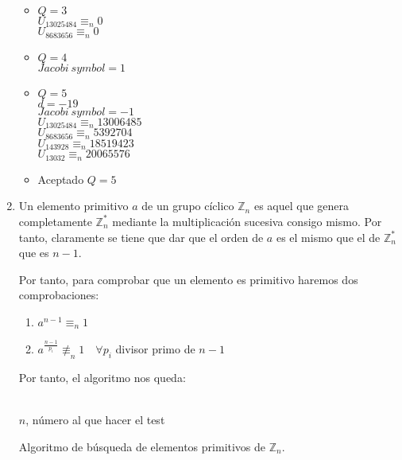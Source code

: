 \begin{enumerate}
\begin{itemize}
			\item $Q = 3$ \\
			$U_{13025484} \equiv_n 0$ \\
			$U_{8683656} \equiv_n 0$
			
			\item $Q = 4$ \\
			$Jacobi\ symbol = 1$
			
			\item $Q = 5$ \\
			$d = -19$ \\
			$Jacobi\ symbol = -1$ \\
			$U_{13025484} \equiv_n 13006485$ \\
			$U_{8683656} \equiv_n 5392704$ \\
			$U_{143928} \equiv_n 18519423$ \\
			$U_{13032} \equiv_n 20065576$
			
			\item Aceptado $Q = 5$
		\end{itemize}

		\item Un elemento primitivo $a$ de un grupo cíclico $\mathbb{Z}_n$ es aquel que genera completamente
		$\mathbb{Z}_n^*$ mediante la multiplicación sucesiva consigo mismo. Por tanto, claramente se tiene que
		dar que el orden de $a$ es el mismo que el de $\mathbb{Z}_n^*$ que es $n-1$.
		
		Por tanto, para comprobar que un elemento es primitivo haremos dos comprobaciones:
		\begin{enumerate}
			\item $a^{n-1} \equiv_n 1$
			\item $a^\frac{n-1}{p_i} \not\equiv_n 1 \quad \forall p_i$ divisor primo de $n-1$
		\end{enumerate}
		
		Por tanto, el algoritmo nos queda:
		\begin{algorithm}[H]
		\begin{algorithmic}[1]
			\REQUIRE \ \\
				\texttt{$n$}, número al que hacer el test \\
				\ELSE
						\ENDIF
					\ENDFOR
				\ENDIF
				\ELSE
				\ENDIF
			\ENDWHILE
			\ENDIF
		\end{algorithmic}
		\caption{Algoritmo de búsqueda de elementos primitivos de $\mathbb{Z}_n$.}
		\label{Primitive}
		\end{algorithm}
	\end{enumerate}
